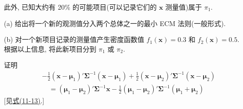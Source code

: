 此外, 已知大约有 20\% 的可能项目(可以记录它们的 $\mathbf{x}$ 测量值)属于 $\pi_1$.

(a) 给出将一个新的观测值分入两个总体之一的最小 ECM 法则(一般形式).

(b) 对一个新项目记录的测量值产生密度函数值 $f_1(\mathbf{x})=0.3$ 和 $f_2(\mathbf{x})=0.5$. 根据以上信息, 将此新项目分到 $\pi_1$ 或 $\pi_2$.

\quad 证明
\[
\begin{aligned}
&-\frac{1}{2}(\mathbf{x}-\boldsymbol{\mu}_1)'\boldsymbol{\Sigma}^{-1}(\mathbf{x}-\boldsymbol{\mu}_1)+\frac{1}{2}(\mathbf{x}-\boldsymbol{\mu}_2)'\boldsymbol{\Sigma}^{-1}(\mathbf{x}-\boldsymbol{\mu}_2)\\
&\quad=(\boldsymbol{\mu}_1-\boldsymbol{\mu}_2)'\boldsymbol{\Sigma}^{-1}\mathbf{x}-\frac{1}{2}(\boldsymbol{\mu}_1-\boldsymbol{\mu}_2)'\boldsymbol{\Sigma}^{-1}(\boldsymbol{\mu}_1+\boldsymbol{\mu}_2)
\end{aligned}
\]
[见\hyperref[eq:11-13]{式(11-13)}.]
